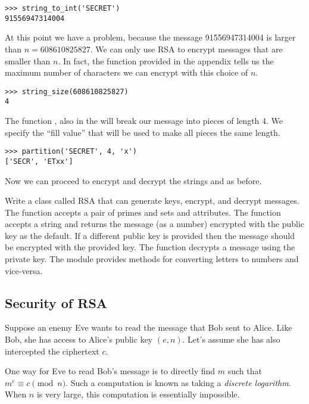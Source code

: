 \begin{lstlisting}
>>> string_to_int('SECRET')
91556947314004
\end{lstlisting}

At this point we have a problem, because the message 91556947314004 is larger than $n=608610825827$.
We can only use RSA to encrypt messages that are smaller than $n.$
In fact, the function  provided in the appendix tells us the maximum number of characters we can encrypt with this choice of $n$.

\begin{lstlisting}
>>> string_size(608610825827)
4
\end{lstlisting}

The function , also in the  will break our message into pieces of length 4.
We specify the ``fill value''  that will be used to make all pieces the same length.

\begin{lstlisting}
>>> partition('SECRET', 4, 'x')
['SECR', 'ETxx']
\end{lstlisting}
Now we can proceed to encrypt and decrypt the strings  and  as before.

\begin{problem}
Write a class called RSA that can generate keys, encrypt, and decrypt messages.
The  function accepts a pair of primes and sets  and  attributes.
The  function accepts a string and returns the message (as a number) encrypted with the public key as the default.
If a different public key is provided then the message should be encrypted with the provided key.
The  function decrypts a message using the private key.
The module  provides methods for converting letters to numbers and vice-versa.
\label{prob:rsa1}
\end{problem}

\subsection*{Security of RSA}
Suppose an enemy Eve wants to read the message that Bob sent to Alice.
Like Bob, she has access to Alice's public key $(e, n)$.
Let's assume she has also intercepted the ciphertext $c$.

One way for Eve to read Bob's message is to directly find $m$ such that $m^e \equiv c \pmod{n}$.
Such a computation is known as taking a \emph{discrete logarithm}.
When $n$ is very large, this computation is essentially impossible.

